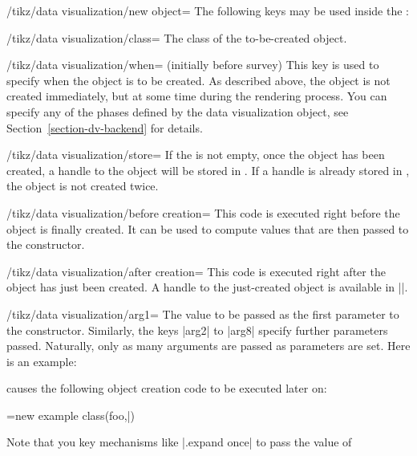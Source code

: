 \begin{key}{/tikz/data visualization/new object=}
  The following keys may be used inside the :
  \begin{key}{/tikz/data visualization/class=}
    The class of the to-be-created object.
  \end{key}
  \begin{key}{/tikz/data visualization/when=
      (initially before survey)}
    This key is used to specify when the object is to be created. As
    described above, the object is not created immediately, but at
    some time during the rendering process. You can specify any of the
    phases defined by the data visualization object, see
    Section~\ref{section-dv-backend} for details.
  \end{key}
  \begin{key}{/tikz/data visualization/store=}
    If the  is not empty, once the object has been
    created, a handle to the object will be stored in . If a handle is already stored in , the
    object is not created twice.
  \end{key}
  \begin{key}{/tikz/data visualization/before creation=}
    This code is executed right before the object is finally
    created. It can be used to compute values that are then passed to
    the constructor.
  \end{key}
  \begin{key}{/tikz/data visualization/after creation=}
    This code is executed right after the object has just been
    created. A handle to the just-created object is available in
    |\tikzdvobj|.
  \end{key}
  \begin{key}{/tikz/data visualization/arg1=}
    The value to be passed as the first parameter to the
    constructor. Similarly, the keys |arg2| to |arg8| specify further
    parameters passed. Naturally, only as many arguments are passed as
    parameters are set. Here is an example:
\begin{codeexample}
\end{codeexample}
  causes the following object creation code to be executed later on:
\begin{codeexample}
\pgfoonew \tikzdvobj=new example class(foo,\bar)
\end{codeexample}
    Note that you key mechanisms like |.expand once| to pass the value of

\end{key}
\end{key}
